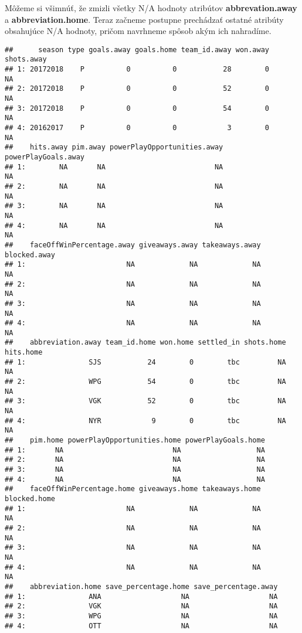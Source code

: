 \documentclass[
]{article}
\newenvironment{Shaded}{\begin{snugshade}}{\end{snugshade}}
\newcommand{\FunctionTok}[1]{\textcolor[rgb]{0.00,0.00,0.00}{#1}}
\newcommand{\NormalTok}[1]{#1}
\newcommand{\SpecialCharTok}[1]{\textcolor[rgb]{0.00,0.00,0.00}{#1}}
\begin{document}
Môžeme si všimnúť, že zmizli všetky N/A hodnoty atribútov
\textbf{abbrevation.away} a \textbf{abbreviation.home}. Teraz začneme
postupne prechádzať ostatné atribúty obsahujúce N/A hodnoty, pričom
navrhneme spôsob akým ich nahradíme.

\begin{Shaded}
\end{Shaded}

\begin{verbatim}
##      season type goals.away goals.home team_id.away won.away shots.away
## 1: 20172018    P          0          0           28        0         NA
## 2: 20172018    P          0          0           52        0         NA
## 3: 20172018    P          0          0           54        0         NA
## 4: 20162017    P          0          0            3        0         NA
##    hits.away pim.away powerPlayOpportunities.away powerPlayGoals.away
## 1:        NA       NA                          NA                  NA
## 2:        NA       NA                          NA                  NA
## 3:        NA       NA                          NA                  NA
## 4:        NA       NA                          NA                  NA
##    faceOffWinPercentage.away giveaways.away takeaways.away blocked.away
## 1:                        NA             NA             NA           NA
## 2:                        NA             NA             NA           NA
## 3:                        NA             NA             NA           NA
## 4:                        NA             NA             NA           NA
##    abbreviation.away team_id.home won.home settled_in shots.home hits.home
## 1:               SJS           24        0        tbc         NA        NA
## 2:               WPG           54        0        tbc         NA        NA
## 3:               VGK           52        0        tbc         NA        NA
## 4:               NYR            9        0        tbc         NA        NA
##    pim.home powerPlayOpportunities.home powerPlayGoals.home
## 1:       NA                          NA                  NA
## 2:       NA                          NA                  NA
## 3:       NA                          NA                  NA
## 4:       NA                          NA                  NA
##    faceOffWinPercentage.home giveaways.home takeaways.home blocked.home
## 1:                        NA             NA             NA           NA
## 2:                        NA             NA             NA           NA
## 3:                        NA             NA             NA           NA
## 4:                        NA             NA             NA           NA
##    abbreviation.home save_percentage.home save_percentage.away
## 1:               ANA                   NA                   NA
## 2:               VGK                   NA                   NA
## 3:               WPG                   NA                   NA
## 4:               OTT                   NA                   NA
\end{verbatim}
\end{document}
